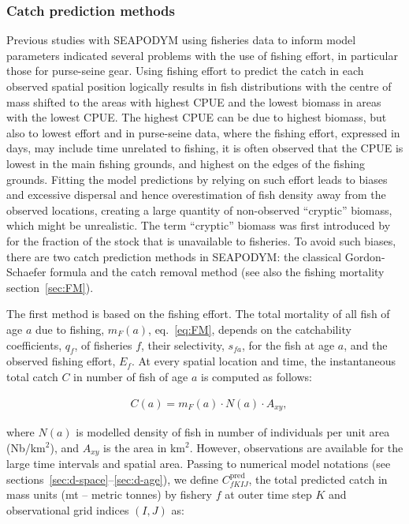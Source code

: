 \subsubsection{Catch prediction methods} \label{sec:predicted-catch}

Previous studies with SEAPODYM using fisheries data to inform model parameters indicated several problems with the use of fishing effort, in particular those for purse-seine gear. Using fishing effort to predict the catch in each observed spatial position logically results in fish distributions with the centre of mass shifted to the areas with highest CPUE and the lowest biomass in areas with the lowest CPUE. The highest CPUE can be due to highest biomass, but also to lowest effort and in purse-seine data, where the fishing effort, expressed in days, may include time unrelated to fishing, it is often observed that the CPUE is lowest in the main fishing grounds, and highest on the edges of the fishing grounds. Fitting the model predictions by relying on such effort leads to biases and excessive dispersal and hence overestimation of fish density away from the observed locations, creating a large quantity of non-observed ``cryptic'' biomass, which might be unrealistic. The term ``cryptic'' biomass was first introduced by \citet{Fonteneau} for the fraction of the stock that is unavailable to fisheries. To avoid such biases, there are two catch prediction methods in SEAPODYM: the classical Gordon-Schaefer formula and the catch removal method (see also the fishing mortality section~\ref{sec:FM}). 

The first method is based on the fishing effort. The total mortality of all fish of age $a$ due to fishing, $m_F(a)$, eq.~\ref{eq:FM}, depends on the catchability coefficients, $q_f$, of fisheries $f$, their selectivity, $s_{fa}$, for the fish at age $a$, and the observed fishing effort, $E_{f}$. At every spatial location and time, the instantaneous total catch $C$ in number of fish of age $a$ is computed as follows: 

\begin{align}
&C(a) = m_F(a) \cdot N(a) \cdot A_{xy}, 
\label{eq:GS-catch-prediction}
\end{align}

\noindent where $N(a)$ is modelled density of fish in number of individuals per unit area (Nb/km$^2$), and $A_{xy}$ is the area in km$^2$. However, observations are available for the large time intervals and spatial area. Passing to numerical model notations (see sections~\ref{sec:d-space}--\ref{sec:d-age}), we define $C^{\text{pred}}_{fKIJ}$, the total predicted catch in mass units (mt -- metric tonnes) by fishery $f$ at outer time step $K$ and observational grid indices $(I,J)$ as:

